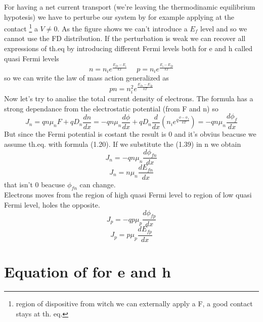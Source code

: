 For having a net current transport (we're leaving the thermodinamic equilibrium hypotesis) we have to perturbe our system by for example applying at the contact \footnote{region of dispositive from witch we can externally apply a F, a good contact stays at th. eq.} a $V\neq 0$. 
As the figure shows  we can't introduce a $E_f$ level and so we cannot use the FD distribution. If the perturbation is weak we can recover all expressions of th.eq by introducing different Fermi levels both for e and h called quasi Fermi levels
\begin{equation}
n=n_ie^{\frac{E_{fn}-E_i}{kT}} \ \ \ \ \ \ p=n_ie^{\frac{E_i-E_{fp}}{kT}}
\end{equation}
so we can write the law of mass action generalized as 
\begin{equation}
pn=n_i^2e^{\frac{E_{fn}-E_{fp}}{kT}}
\end{equation}
Now let's try to analise the total current density of electrons. The formula has a strong dependance from the electrostatic potential (from F and n) so
\begin{equation}
J_n=qn\mu_nF+qD_n\frac{dn}{dx}=-qn\mu_n\frac{d\phi}{dx}+qD_n\frac{d}{dx}\left(n_ie^{q\frac{\phi-\phi_f}{kT}}\right)=-qn\mu_n\frac{d\phi_f}{dx}
\end{equation} 
But since the Fermi potential is costant the result is 0 and it's obvius beacuse we assume th.eq. with formula (1.20).
If we substitute the (1.39) in n we obtain
\begin{equation}
J_n=-qn\mu_n\frac{d\phi_{fn}}{dx}
\end{equation}
\begin{equation}
J_n=n\mu_n\frac{dE_{fn}}{dx}
\end{equation}  
that isn't 0 beacuse $\phi_{fn}$ can change.\\
Electrons moves from the region of high quasi Fermi level to region of low quasi Fermi level, holes the opposite.
\begin{equation}
J_p=-qp\mu_p\frac{d\phi_{fp}}{dx}
\end{equation}
\begin{equation}
J_p=p\mu_p\frac{dE_{fp}}{dx}
\end{equation}  
\newline
\section{Equation of for e and h}

